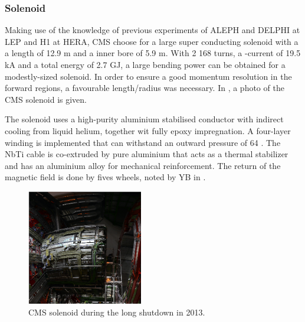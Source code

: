 \subsubsection{Solenoid}
	Making use of the knowledge of previous experiments of ALEPH and DELPHI at LEP and H1 at HERA, CMS choose for a large super conducting solenoid with a a length of 12.9 \si{ \meter} and a inner bore of 5.9 \si{ \meter}\cite{Bayatian:922757}. With 2 168 turns, a -current of 19.5 \si{ \kilo \ampere} and  a total energy of 2.7 \si{ \giga \joule}, a large bending power can be obtained for a modestly-sized solenoid. In order to ensure a good momentum resolution in the forward regions, a favourable length/radius was necessary.  In , a photo of the CMS solenoid is given. 

	The solenoid uses a high-purity aluminium stabilised conductor with indirect cooling from liquid helium, together wit fully epoxy impregnation. A four-layer winding is implemented that can withstand an outward pressure of 64 \si{ \atm}. The NbTi cable is co-extruded by pure aluminium that acts as a thermal stabilizer and has an aluminium alloy for mechanical reinforcement. The return of the magnetic field is done by fives wheels, noted by YB in .
	
	\begin{figure}[ht]
		\centering
		\includegraphics[width=0.45\textwidth]{2_ExperimentalSetup/Figures/solenoid}
		\caption{CMS solenoid during the long shutdown in 2013. }
		\label{fig:CMSsolenoid}
	\end{figure}	
	
